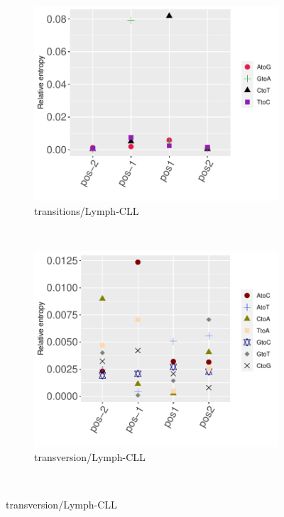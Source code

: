 \begin{figure}[ht!]\ContinuedFloat
    \begin{subfigure}{.5\textwidth}
    \includegraphics[scale=0.63]{graphics/nbr_transitions_Lymph-CLL.pdf}
    \caption{transitions/Lymph-CLL}
    \label{fig:transitions_lymph-cll}
    \end{subfigure}
    ~
    \begin{subfigure}{.5\textwidth}
    \includegraphics[scale=0.63]{graphics/nbr_transversion_Lymph-CLL.pdf}
    \caption{transversion/Lymph-CLL}
    \label{fig:transversion_lymph-cll}
    \end{subfigure} \\
    \vspace{0.5cm}
    

\end{figure}
